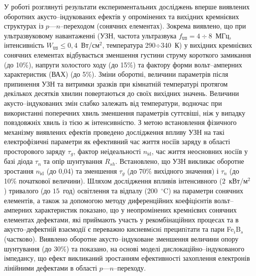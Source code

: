 У  роботі розглянуті результати експериментальних досліджень вперше виявлених оборотних акусто--індукованих ефектів у опромінених та вихідних кремнієвих структурах із  $p$---$n$--переходом (сонячних елементах).
Зокрема виявлено, що при ультразвуковому навантаженні (УЗН, частота ультразвука $f_\mathtt{US}=4\div8$~МГц, інтенсивність $W_\mathtt{US}\leq0,4$~Вт/см$^2$, температура 290$\div$340~К) у вихідних кремнієвих сонячних елементах  відбувається  зменшення густини струму короткого замикання (до 10\%), напруги холостого ходу  (до 15\%) та фактору форми вольт--амперних характеристик (ВАХ) (до 5\%).
Зміни оборотні, величини параметрів  після припинення УЗН  та витримки зразків при кімнатній температурі протягом декількох десятків хвилин повертаються до своїх вихідних значень.
Величини акусто--індукованих змін слабко залежать від температури, водночас при використанні поперечних хвиль зменшення параметрів суттєвіші, ніж у випадку повздовжніх хвиль із тією ж інтенсивністю.
З метою встановлення фізичного механізму виявлених ефектів проведено дослідження впливу УЗН на такі електрофізичні параметри як
ефективний час життя носіїв заряду в області просторового заряду $\tau_{g}$,
фактор неідеальності $n_\mathrm{id}$,
час життя неосновних носіїв у базі діода $\tau_n$
та опір шунтування $R_{sh}$.
Встановлено, що УЗН викликає оборотне зростання $n_\mathrm{id}$  (до 0,04) та зменшення $\tau_g$ (до 70\% вихідного значення) і
$\tau_n$ (до 10\% початкової величини).
Шляхом дослідження  впливів інтенсивного ($2$~кВт/м$^2$) тривалого (до  $15$~год) освітлення
та відпалу (200~$^\circ$C) на параметри сонячних елементів,
а також за допомогою
методу диференційних коефіцієнтів вольт--амперних характеристик показано, що
у неопромінених кремнієвих сонячних елементах
дефектами, які приймають участь у рекомбінаційних процесах та  в акусто--дефектній взаємодії є переважно кисневмiснi преципiтати та
пари Fe$_i$B$_s$ (частково).
Виявлено оборотне акусто--індуковане зменшення величини  опору шунтування (до 30\%) та показано,
на основі моделі дислокаційно--індукованого імпедансу, що ефект викликаний зростанням ефективності захоплення електронів лінійними дефектами в області $p$---$n$--переходу.


